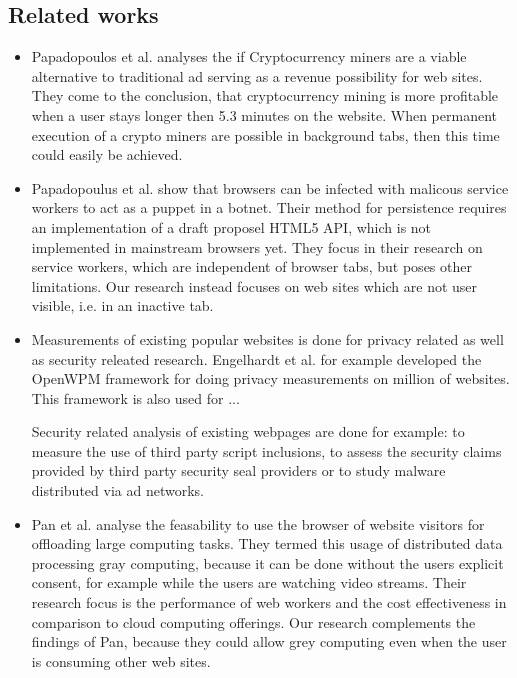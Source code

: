 \documentclass[article,type=bsc,colorback,accentcolor=tud9c]{tudthesis}
\begin{document}
  

  \subsection{Related works}

  \begin{itemize}

  \item Papadopoulos et al.\autocite{papadopoulos2018truth} analyses the if Cryptocurrency miners are a viable alternative to traditional ad serving as a revenue possibility for web sites. They come to the conclusion, that cryptocurrency mining is more profitable when a user stays longer then 5.3 minutes on the website. When permanent execution of a crypto miners are possible in background tabs, then this time could easily be achieved.

  \item Papadopoulus et al.\cite{papadopoulos2018master} show that browsers can be infected with malicous service workers to act as a puppet in a botnet. Their method for persistence requires an implementation of a draft proposel HTML5 API, which is not implemented in mainstream browsers yet. They focus in their research on service workers, which are independent of browser tabs, but poses other limitations. Our research instead focuses on web sites which are not user visible, i.e. in an inactive tab.   

    
  \item Measurements of existing popular websites is done for privacy related as well as security releated research. Engelhardt et al.\cite{englehardt2016online} for example developed the OpenWPM framework for doing privacy measurements on million of websites. This framework is also used for ...

    Security related analysis of existing webpages are done for example: to measure the use of third party script inclusions\cite{nikiforakis2012you}, to assess the security claims provided by third party security seal providers\cite{van2014clubbing} or to study malware distributed via ad networks\cite{zarras2014dark}.


  \item Pan et al. analyse the feasability to use the browser of website visitors for offloading large computing tasks\cite{pan2015gray}. They termed this usage of distributed data processing gray computing, because it can be done without the users explicit consent, for example while the users are watching video streams. Their research focus is the performance of web workers and the cost effectiveness in comparison to cloud computing offerings. Our research complements the findings of Pan, because they could allow grey computing even when the user is consuming other web sites.

    
  \end{itemize}
\end{document}
